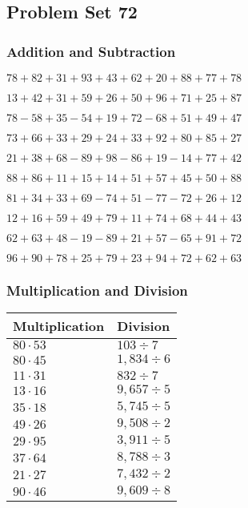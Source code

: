 \hypertarget{problem-set-72}{%
\subsection{Problem Set 72}\label{problem-set-72}}

\hypertarget{addition-and-subtraction}{%
\subsubsection{Addition and
Subtraction}\label{addition-and-subtraction}}

\(78+82+31+93+43+62+20+88+77+78\)

\(13+42+31+59+26+50+96+71+25+87\)

\(78-58+35-54+19+72-68+51+49+47\)

\(73+66+33+29+24+33+92+80+85+27\)

\(21+38+68-89+98-86+19-14+77+42\)

\(88+86+11+15+14+51+57+45+50+88\)

\(81+34+33+69-74+51-77-72+26+12\)

\(12+16+59+49+79+11+74+68+44+43\)

\(62+63+48-19-89+21+57-65+91+72\)

\(96+90+78+25+79+23+94+72+62+63\)

\hypertarget{multiplication-and-division}{%
\subsubsection{Multiplication and
Division}\label{multiplication-and-division}}

\begin{longtable}[]{@{}ll@{}}
\toprule
Multiplication & Division\tabularnewline
\midrule
\endhead
\(80\cdot53\) & \(103÷7\)\tabularnewline
\(80\cdot45\) & \(1,834÷6\)\tabularnewline
\(11\cdot31\) & \(832÷7\)\tabularnewline
\(13\cdot16\) & \(9,657÷5\)\tabularnewline
\(35\cdot18\) & \(5,745÷5\)\tabularnewline
\(49\cdot26\) & \(9,508÷2\)\tabularnewline
\(29\cdot95\) & \(3,911÷5\)\tabularnewline
\(37\cdot64\) & \(8,788÷3\)\tabularnewline
\(21\cdot27\) & \(7,432÷2\)\tabularnewline
\(90\cdot46\) & \(9,609÷8\)\tabularnewline
\bottomrule
\end{longtable}
